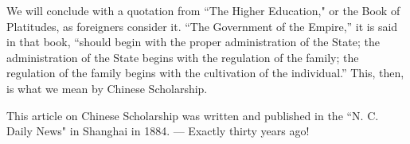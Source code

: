 We will conclude with a quotation from ``The Higher Education," or the Book of Platitudes, as foreigners consider it.
``The Government of the Empire,'' it is said in that book, ``should begin with the proper administration of the State; the administration of the State begins with the regulation of the family; the regulation of the family begins with the cultivation of the individual.''
This, then, is what we mean by Chinese Scholarship.

{\scriptsize This article on Chinese Scholarship was written and published in the ``N. C. Daily News" in Shanghai in 1884. --- Exactly thirty years ago!}
